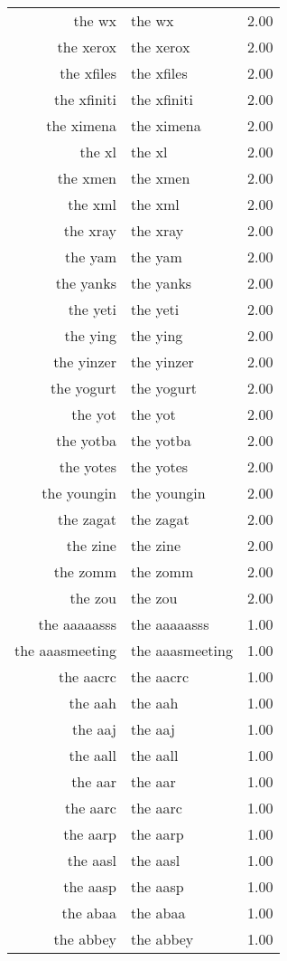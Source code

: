 \begin{table}[ht]
\begin{tabular}{rlr}
  the wx & the wx & 2.00 \\ 
  the xerox & the xerox & 2.00 \\ 
  the xfiles & the xfiles & 2.00 \\ 
  the xfiniti & the xfiniti & 2.00 \\ 
  the ximena & the ximena & 2.00 \\ 
  the xl & the xl & 2.00 \\ 
  the xmen & the xmen & 2.00 \\ 
  the xml & the xml & 2.00 \\ 
  the xray & the xray & 2.00 \\ 
  the yam & the yam & 2.00 \\ 
  the yanks & the yanks & 2.00 \\ 
  the yeti & the yeti & 2.00 \\ 
  the ying & the ying & 2.00 \\ 
  the yinzer & the yinzer & 2.00 \\ 
  the yogurt & the yogurt & 2.00 \\ 
  the yot & the yot & 2.00 \\ 
  the yotba & the yotba & 2.00 \\ 
  the yotes & the yotes & 2.00 \\ 
  the youngin & the youngin & 2.00 \\ 
  the zagat & the zagat & 2.00 \\ 
  the zine & the zine & 2.00 \\ 
  the zomm & the zomm & 2.00 \\ 
  the zou & the zou & 2.00 \\ 
  the aaaaasss & the aaaaasss & 1.00 \\ 
  the aaasmeeting & the aaasmeeting & 1.00 \\ 
  the aacrc & the aacrc & 1.00 \\ 
  the aah & the aah & 1.00 \\ 
  the aaj & the aaj & 1.00 \\ 
  the aall & the aall & 1.00 \\ 
  the aar & the aar & 1.00 \\ 
  the aarc & the aarc & 1.00 \\ 
  the aarp & the aarp & 1.00 \\ 
  the aasl & the aasl & 1.00 \\ 
  the aasp & the aasp & 1.00 \\ 
  the abaa & the abaa & 1.00 \\ 
  the abbey & the abbey & 1.00 \\ 

\end{tabular}
\end{table}
